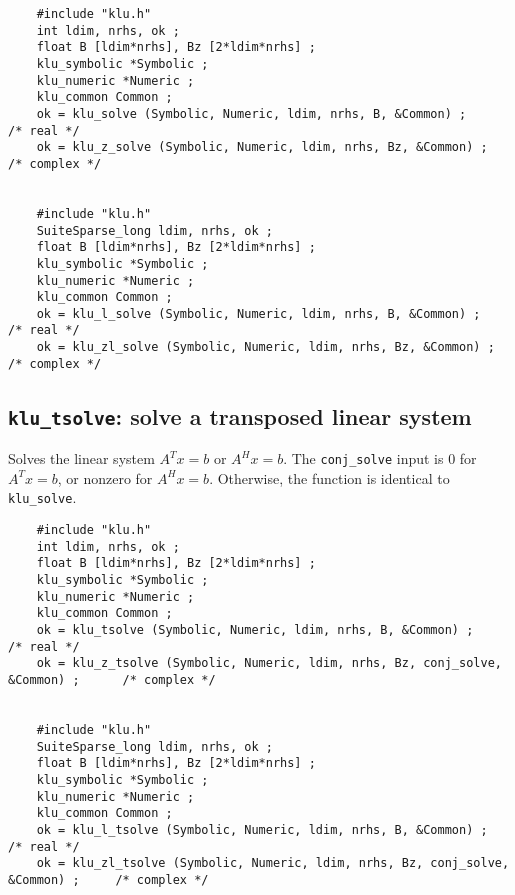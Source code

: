 \documentclass[11pt]{article}
\begin{document}
{\footnotesize
\begin{verbatim}
    #include "klu.h"
    int ldim, nrhs, ok ;
    float B [ldim*nrhs], Bz [2*ldim*nrhs] ;
    klu_symbolic *Symbolic ;
    klu_numeric *Numeric ;
    klu_common Common ;
    ok = klu_solve (Symbolic, Numeric, ldim, nrhs, B, &Common) ;                      /* real */
    ok = klu_z_solve (Symbolic, Numeric, ldim, nrhs, Bz, &Common) ;                   /* complex */


    #include "klu.h"
    SuiteSparse_long ldim, nrhs, ok ;
    float B [ldim*nrhs], Bz [2*ldim*nrhs] ;
    klu_symbolic *Symbolic ;
    klu_numeric *Numeric ;
    klu_common Common ;
    ok = klu_l_solve (Symbolic, Numeric, ldim, nrhs, B, &Common) ;                    /* real */
    ok = klu_zl_solve (Symbolic, Numeric, ldim, nrhs, Bz, &Common) ;                  /* complex */
\end{verbatim}
}

\subsection{{\tt klu\_tsolve}: solve a transposed linear system}

Solves the linear system $A^Tx=b$ or $A^Hx=b$.  The {\tt conj\_solve} input
is 0 for $A^Tx=b$, or nonzero for $A^Hx=b$.  Otherwise, the function is
identical to {\tt klu\_solve}.


{\footnotesize
\begin{verbatim}
    #include "klu.h"
    int ldim, nrhs, ok ;
    float B [ldim*nrhs], Bz [2*ldim*nrhs] ;
    klu_symbolic *Symbolic ;
    klu_numeric *Numeric ;
    klu_common Common ;
    ok = klu_tsolve (Symbolic, Numeric, ldim, nrhs, B, &Common) ;                     /* real */
    ok = klu_z_tsolve (Symbolic, Numeric, ldim, nrhs, Bz, conj_solve, &Common) ;      /* complex */


    #include "klu.h"
    SuiteSparse_long ldim, nrhs, ok ;
    float B [ldim*nrhs], Bz [2*ldim*nrhs] ;
    klu_symbolic *Symbolic ;
    klu_numeric *Numeric ;
    klu_common Common ;
    ok = klu_l_tsolve (Symbolic, Numeric, ldim, nrhs, B, &Common) ;                   /* real */
    ok = klu_zl_tsolve (Symbolic, Numeric, ldim, nrhs, Bz, conj_solve, &Common) ;     /* complex */
\end{verbatim}
}


\end{document}

